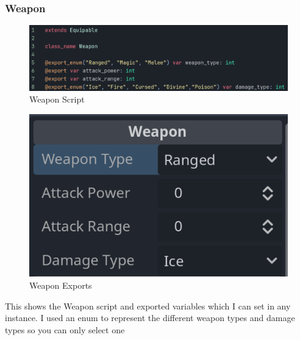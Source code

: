 \documentclass{article}
\begin{document}
        \subsubsection{Weapon}
        \begin{multicols}{2}
                \begin{figure}[H]
                        \centering
                        \includegraphics[width = \columnwidth]{images/development/Weapon_script.PNG}
                        \caption{Weapon Script}
                \end{figure}
                \begin{figure}[H]
                        \centering
                        \includegraphics[width = 0.9\columnwidth]{images/development/Weapon_export.PNG}
                        \caption{Weapon Exports}
                \end{figure}
        \end{multicols}
        \[\]
        This shows the Weapon script and exported variables which I can set in any instance. I used an enum to represent the different weapon types and damage types so you can only select one
\end{document}
